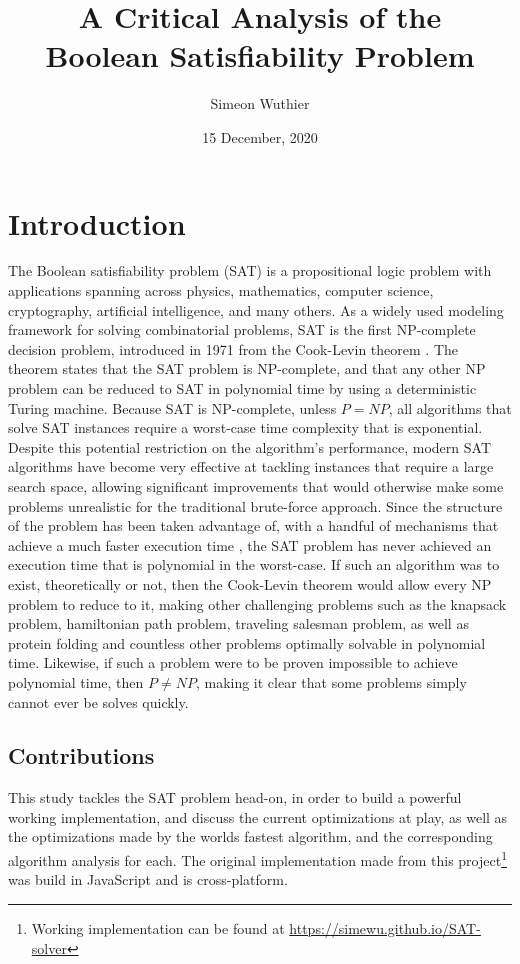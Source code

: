 \documentclass[runningheads]{llncs}
\title{A Critical Analysis of the\\Boolean Satisfiability Problem}
\author{Simeon Wuthier}
\institute{
    \textit{Department of Computer Science}\\
    \textit{University of Colorado, Colorado Springs}\\
    \email{swuthier@uccs.edu}\\
}
\date{15 December, 2020}
\begin{document}
\maketitle
{}

\section{Introduction}

The Boolean satisfiability problem (SAT) is a propositional logic problem with applications spanning across physics, mathematics, computer science, cryptography, artificial intelligence, and many others. As a widely used modeling framework for solving combinatorial problems, SAT is the first NP-complete decision problem, introduced in 1971 from the Cook-Levin theorem \cite{cook1971complexity}. The theorem states that the SAT problem is NP-complete, and that any other NP problem can be reduced to SAT in polynomial time by using a deterministic Turing machine. Because SAT is NP-complete, unless \emph{$P = NP$}, all algorithms that solve SAT instances require a worst-case time complexity that is exponential. Despite this potential restriction on the algorithm's performance, modern SAT algorithms have become very effective at tackling instances that require a large search space, allowing significant improvements that would otherwise make some problems unrealistic for the traditional brute-force approach. Since the structure of the problem has been taken advantage of, with a handful of mechanisms that achieve a much faster execution time \cite{silva2003grasp}\cite{moskewicz2001chaff}\cite{een2003extensible}\cite{goldberg2007berkmin}, the SAT problem has never achieved an execution time that is polynomial in the worst-case. If such an algorithm was to exist, theoretically or not, then the Cook-Levin theorem would allow every NP problem to reduce to it, making other challenging problems such as the knapsack problem, hamiltonian path problem, traveling salesman problem, as well as protein folding and countless other problems optimally solvable in polynomial time. Likewise, if such a problem were to be proven impossible to achieve polynomial time, then \emph{$P \neq NP$}, making it clear that some problems simply cannot ever be solves quickly.  %

\subsection{Contributions}
This study tackles the SAT problem head-on, in order to build a powerful working implementation, and discuss the current optimizations at play, as well as the optimizations made by the worlds fastest algorithm, and the corresponding algorithm analysis for each. The original implementation made from this project\footnote{Working implementation can be found at \url{https://simewu.github.io/SAT-solver}} was build in JavaScript and is cross-platform.
\end{document}
